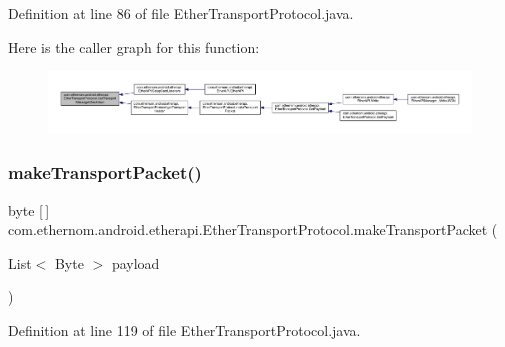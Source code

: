 Definition at line 86 of file Ether\+Transport\+Protocol.\+java.

Here is the caller graph for this function\+:
\nopagebreak
\begin{figure}[H]
\begin{center}
\leavevmode
\includegraphics[width=350pt]{classcom_1_1ethernom_1_1android_1_1etherapi_1_1_ether_transport_protocol_a2689adc9963e71cb1f6814c331c6ffa5_icgraph}
\end{center}
\end{figure}
\mbox{\label{classcom_1_1ethernom_1_1android_1_1etherapi_1_1_ether_transport_protocol_a0d8874e2def3ca2e1372409470124bae}} 
\subsubsection{\texorpdfstring{make\+Transport\+Packet()}{makeTransportPacket()}}
{\footnotesize\ttfamily byte \mbox{[}$\,$\mbox{]} com.\+ethernom.\+android.\+etherapi.\+Ether\+Transport\+Protocol.\+make\+Transport\+Packet (\begin{DoxyParamCaption}\item[{List$<$ Byte $>$}]{payload }\end{DoxyParamCaption})\hspace{0.3cm}{\ttfamily [private]}}



Definition at line 119 of file Ether\+Transport\+Protocol.\+java.

